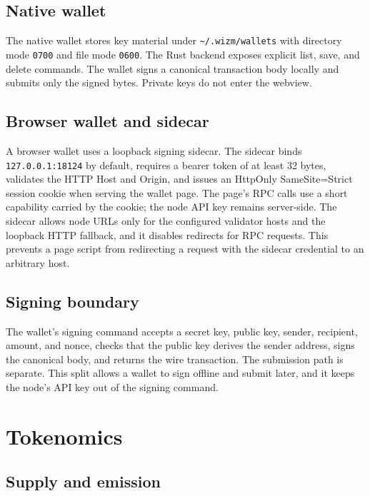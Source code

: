 \documentclass[11pt,a4paper]{article}
\begin{document}
\subsection{Native wallet}

The native wallet stores key material under \texttt{\~{}/.wizm/wallets} with
directory mode \texttt{0700} and file mode \texttt{0600}. The Rust backend
exposes explicit list, save, and delete commands. The wallet signs a canonical
transaction body locally and submits only the signed bytes. Private keys do
not enter the webview.

\subsection{Browser wallet and sidecar}

A browser wallet uses a loopback signing sidecar. The sidecar binds
\texttt{127.0.0.1:18124} by default, requires a bearer token of at least 32
bytes, validates the HTTP Host and Origin, and issues an HttpOnly
SameSite=Strict session cookie when serving the wallet page. The page's RPC
calls use a short capability carried by the cookie; the node API key remains
server-side. The sidecar allows node URLs only for the configured validator
hosts and the loopback HTTP fallback, and it disables redirects for RPC
requests. This prevents a page script from redirecting a request with the
sidecar credential to an arbitrary host.

\subsection{Signing boundary}

The wallet's signing command accepts a secret key, public key, sender,
recipient, amount, and nonce, checks that the public key derives the sender
address, signs the canonical body, and returns the wire transaction. The
submission path is separate. This split allows a wallet to sign offline and
submit later, and it keeps the node's API key out of the signing command.

\section{Tokenomics}

\subsection{Supply and emission}
\end{document}
